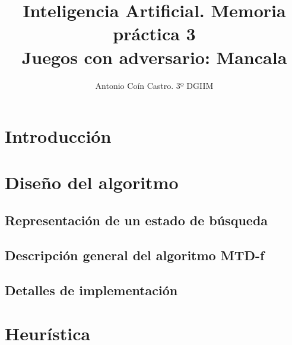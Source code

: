 \documentclass[11pt,a4paper]{article}
\title{Inteligencia Artificial. Memoria práctica 3 \\ \Large{Juegos con adversario: Mancala}}
\author{Antonio Coín Castro. 3º DGIIM}
\date{}
\begin{document}
\maketitle

\section{Introducción}

\section{Diseño del algoritmo}

\subsection*{Representación de un estado de búsqueda}

\subsection*{Descripción general del algoritmo MTD-f}

\subsection*{Detalles de implementación}

\section{Heurística}


\begin{thebibliography}{9}

\end{thebibliography}
\end{document}
